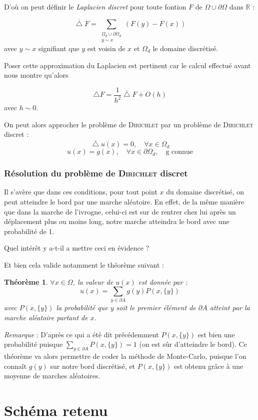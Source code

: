 \documentclass[12pt, a4paper]{article}
\newtheorem*{theo}{Théorème} %
\begin{document}
D'où on peut définir le \emph{Laplacien discret} pour toute fontion $F$ de $\Omega \cup \partial
\Omega$ dans $\mathbb{R}$ :

\[ \overline{\bigtriangleup}F = \sum\limits_{\substack{\Omega_d \cup \partial \Omega_d \\ y \sim x}}
(F(y) - F(x)) \] avec $y\sim x$ signifiant que $y$ est voisin de $x$ et $\Omega_d$ le domaine
discrétisé.

Poser cette approximation du Laplacien est pertinent car le calcul effectué avant nous montre
qu'alors

\[ \bigtriangleup F = \frac{1}{h^2}\overline{\bigtriangleup}F + O(h) \] avec $h \sim 0$.

On peut alors approcher le problème de \textsc{Dirichlet} par un problème de \textsc{Dirichlet} discret :
\[\overline{\bigtriangleup} u(x) = 0, \quad \forall x \in \Omega_d\] \[u(x) = g(x), \quad \forall x
\in \partial \Omega_d, \quad \text{g connue}\]

\subsubsection{Résolution du problème de \textsc{Dirichlet} discret} Il s'avère que dans ces conditions, pour
tout point $x$ du domaine discrétisé, on peut atteindre le bord par une marche aléatoire.  En effet,
de la même manière que dans la marche de l'ivrogne, celui-ci est sur de rentrer chez lui après un
déplacement plus ou moins long, notre marche atteindra le bord avec une probabilité de 1.

Quel intérêt y a-t-il a mettre ceci en évidence ?

Et bien cela valide notamment le théorème suivant :

\begin{theo} $\forall x \in \Omega$, la valeur de $u(x)$ est donnée par : \[ u(x) = \sum_{y\in
    \partial A} g(y) P(x, \{y\}) \] avec $P(x, \{y\})$ la probabilité que $y$ soit le premier
    élément de $\partial A$ atteint par la marche aléatoire partant de $x$.  \end{theo}
\emph{Remarque} : D'après ce qui a été dit précédemment $P(x, \{y\})$ est bien une probabilité
puisque $\sum_{y\in \partial A} P(x, \{y\}) = 1$ (on est sûr d'atteindre le bord).  \smallbreak Ce
théorème va alors permettre de coder la méthode de Monte-Carlo, puisque l'on connaît $g(y)$ sur
notre bord discrétisé, et $P(x, \{y\})$ est obtenu grâce à une moyenne de marches aléatoires.

\section{Schéma retenu}
\end{document}
